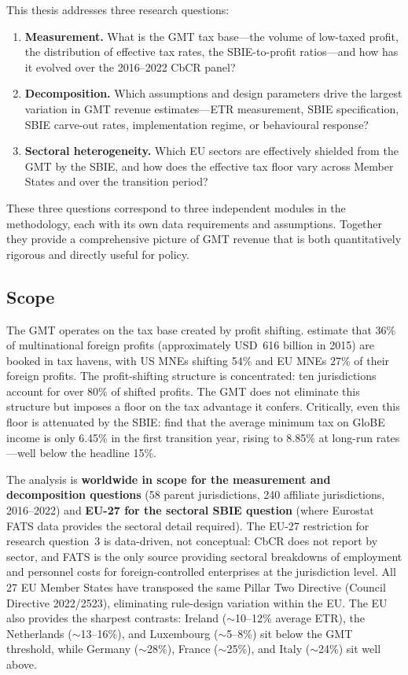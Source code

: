 \documentclass[11pt,a4paper]{article}
\begin{document}
This thesis addresses three research questions:

\begin{enumerate}
\item \textbf{Measurement.} What is the GMT tax base---the volume of low-taxed profit, the distribution of effective tax rates, the SBIE-to-profit ratios---and how has it evolved over the 2016--2022 CbCR panel?

\item \textbf{Decomposition.} Which assumptions and design parameters drive the largest variation in GMT revenue estimates---ETR measurement, SBIE specification, SBIE carve-out rates, implementation regime, or behavioural response?

\item \textbf{Sectoral heterogeneity.} Which EU sectors are effectively shielded from the GMT by the SBIE, and how does the effective tax floor vary across Member States and over the transition period?
\end{enumerate}

These three questions correspond to three independent modules in the methodology, each with its own data requirements and assumptions. Together they provide a comprehensive picture of GMT revenue that is both quantitatively rigorous and directly useful for policy.

\subsection{Scope}\label{sec:scope}

The GMT operates on the tax base created by profit shifting. \citet{torslov2022} estimate that 36\% of multinational foreign profits (approximately USD~616 billion in 2015) are booked in tax havens, with US MNEs shifting 54\% and EU MNEs 27\% of their foreign profits. The profit-shifting structure is concentrated: ten jurisdictions account for over 80\% of shifted profits. The GMT does not eliminate this structure but imposes a floor on the tax advantage it confers. Critically, even this floor is attenuated by the SBIE: \citet{devereux2023} find that the average minimum tax on GloBE income is only 6.45\% in the first transition year, rising to 8.85\% at long-run rates---well below the headline 15\%.

The analysis is \textbf{worldwide in scope for the measurement and decomposition questions} (58 parent jurisdictions, 240 affiliate jurisdictions, 2016--2022) and \textbf{EU-27 for the sectoral SBIE question} (where Eurostat FATS data provides the sectoral detail required). The EU-27 restriction for research question~3 is data-driven, not conceptual: CbCR does not report by sector, and FATS is the only source providing sectoral breakdowns of employment and personnel costs for foreign-controlled enterprises at the jurisdiction level. All 27 EU Member States have transposed the same Pillar Two Directive (Council Directive 2022/2523), eliminating rule-design variation within the EU. The EU also provides the sharpest contrasts: Ireland ($\sim$10--12\% average ETR), the Netherlands ($\sim$13--16\%), and Luxembourg ($\sim$5--8\%) sit below the GMT threshold, while Germany ($\sim$28\%), France ($\sim$25\%), and Italy ($\sim$24\%) sit well above.
\end{document}
